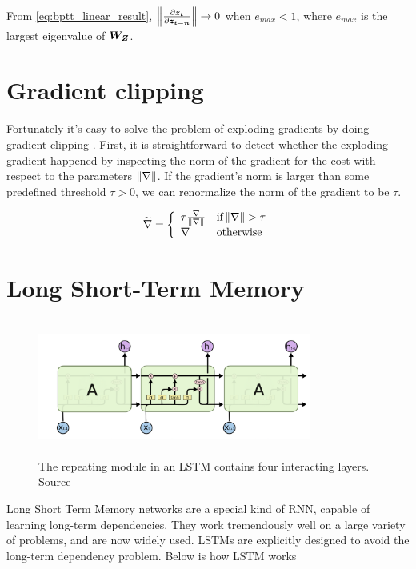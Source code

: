 From \cref{eq:bptt_linear_result}, $\norm{\frac{\partial \vect{z_t}}{\partial \vect{z_{t-n}}}} \rightarrow 0$ when $e_{max} < 1$, where $e_{max}$ is the largest eigenvalue of $\matr{W_Z}$.

\section{Gradient clipping}
Fortunately it's easy to solve the problem of exploding gradients by doing gradient clipping \cite{1211.5063}.
First, it is straightforward to detect whether the exploding gradient happened by inspecting the norm of the gradient for the cost with respect to the parameters $\norm{\nabla}$.
If the gradient's norm is larger than some predefined threshold $\tau > 0$, we can renormalize the norm of the gradient to be $\tau$.

\[
\widetilde{\nabla}=\left\{
            \begin{array}{ll}
              \tau\frac{\nabla}{\norm{\nabla}} & \text{if}  \norm{\nabla}>\tau\\
              \nabla & \text{otherwise}
            \end{array}
          \right.
\]

\section{Long Short-Term Memory}

\begin{figure}[h]
  \centering
      \includegraphics[width=0.8\textwidth,height=4.5cm]{lectures/06-b-rnn/image/lstm.png}
          \caption{
            The repeating module in an LSTM contains four interacting layers.
            \href{http://colah.github.io/posts/2015-08-Understanding-LSTMs/}{Source}
          }
          \label{fig:lstm}
\end{figure}

Long Short Term Memory networks \cite{article-lstm} are a special kind of RNN, capable of learning long-term dependencies. 
They work tremendously well on a large variety of problems, and are now widely used.
LSTMs are explicitly designed to avoid the long-term dependency problem. 
Below is how LSTM works

